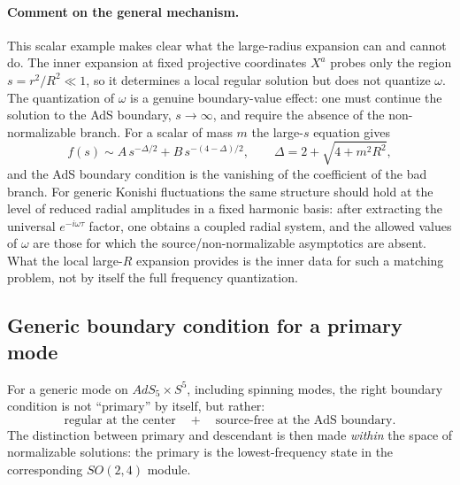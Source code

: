 \documentclass[12pt]{article}
\newcommand{\D}{\Delta}
\begin{document}
\paragraph{Comment on the general mechanism.}
This scalar example makes clear what the large-radius expansion can and cannot do.  The inner expansion
at fixed projective coordinates $X^a$ probes only the region $s=r^2/R^2\ll 1$, so it determines a local
regular solution but does not quantize $\omega$.  The quantization of $\omega$ is a genuine boundary-value
effect: one must continue the solution to the AdS boundary, $s\to\infty$, and require the absence of the
non-normalizable branch.  For a scalar of mass $m$ the large-$s$ equation gives
\begin{equation}
f(s)\sim A\,s^{-\D/2}+B\,s^{-(4-\D)/2},
\qquad
\D=2+\sqrt{4+m^2R^2},
\end{equation}
and the AdS boundary condition is the vanishing of the coefficient of the bad branch.  For generic
Konishi fluctuations the same structure should hold at the level of reduced radial amplitudes in a fixed
harmonic basis: after extracting the universal $e^{-i\omega\tau}$ factor, one obtains a coupled radial
system, and the allowed values of $\omega$ are those for which the source/non-normalizable asymptotics are
absent.  What the local large-$R$ expansion provides is the inner data for such a matching problem, not by
itself the full frequency quantization.

\subsection*{Generic boundary condition for a primary mode}

For a generic mode on $AdS_5\times S^5$, including spinning modes, the right boundary condition is not
``primary'' by itself, but rather:
\begin{equation}
\text{regular at the center}
\quad + \quad
\text{source-free at the AdS boundary}.
\end{equation}
The distinction between primary and descendant is then made \emph{within} the space of normalizable
solutions: the primary is the lowest-frequency state in the corresponding $SO(2,4)$ module.
\end{document}
